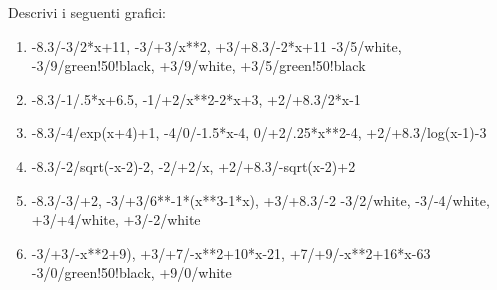 \bigskip

\begin{esercizio}\label{ese:stufun.8g}
Descrivi i seguenti grafici:
\begin{multicols}{2}
 \begin{enumerate} [left=0pt, label=\alph*)]
  \item \myp 
{}
             {-8.3/-3/2*x+11, -3/+3/x**2, +3/+8.3/-2*x+11}
             {-3/5/white, -3/9/green!50!black, 
             +3/9/white, +3/5/green!50!black} %
  \item \myp 
{}
             {-8.3/-1/.5*x+6.5, -1/+2/x**2-2*x+3, +2/+8.3/2*x-1}
             {} %
  \item \myp 
{}
             {-8.3/-4/exp(x+4)+1, -4/0/-1.5*x-4, 
              0/+2/.25*x**2-4, +2/+8.3/log(x-1)-3}
             {} %
\vspace{1mm}
  \item \myp 
{}
             {-8.3/-2/sqrt(-x-2)-2, -2/+2/x, +2/+8.3/-sqrt(x-2)+2}
             {} %
  \item \myp 
{}
             {-8.3/-3/+2, -3/+3/6**-1*(x**3-1*x), +3/+8.3/-2}
             {-3/2/white, -3/-4/white, +3/+4/white, +3/-2/white} %
  \item \myp 
{}
             {-3/+3/-x**2+9), +3/+7/-x**2+10*x-21, +7/+9/-x**2+16*x-63}
             {-3/0/green!50!black, +9/0/white} %
 \end{enumerate}
\end{multicols}
\end{esercizio}

